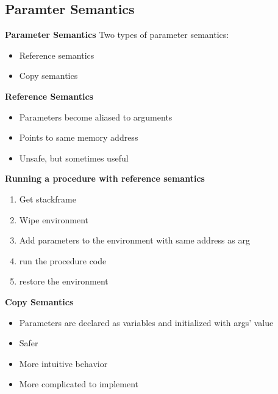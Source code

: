 \subsection*{Paramter Semantics}
\begin{frame}{\textbf{Parameter Semantics}}
    \Large
    Two types of parameter semantics:
    \begin{itemize}
        \item Reference semantics
        \item Copy semantics
    \end{itemize}
\end{frame}

\begin{frame}{\textbf{Reference Semantics}}
    \Large
    \begin{itemize}
        \item Parameters become aliased to arguments 
        \item Points to same memory address
        \item Unsafe, but sometimes useful
    \end{itemize}
\end{frame}
\begin{frame}{\textbf{Running a procedure with reference semantics}}
    \Large
    \begin{enumerate}[<+->]
        \item Get stackframe
        \item Wipe environment
        \item Add parameters to the environment with same address as arg
        \item run the procedure code
        \item restore the environment
    \end{enumerate}
\end{frame}
\begin{frame}{\textbf{Copy Semantics}}
    \Large
    \begin{itemize}
        \item Parameters are declared as variables and initialized with args' value
        \item Safer
        \item More intuitive behavior
        \item More complicated to implement
    \end{itemize}
\end{frame}

